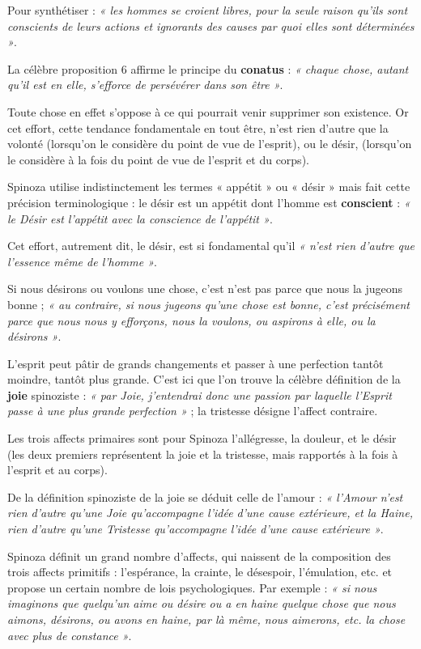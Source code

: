 Pour synthétiser : {\it « les hommes se croient libres, pour la seule raison qu’ils
sont conscients de leurs actions et ignorants des causes par quoi elles sont
déterminées »}.

\vspace{0.5cm}
La célèbre proposition 6 affirme le principe du {\bf conatus} : {\it « chaque chose, autant
qu’il est en elle, s’efforce de persévérer dans son être »}.

Toute chose en effet s’oppose à ce qui pourrait venir supprimer son existence.
Or cet effort, cette tendance fondamentale en tout être, n’est rien d’autre que
la volonté (lorsqu’on le considère du point de vue de l’esprit), ou le désir,
(lorsqu’on le considère à la fois du point de vue de l’esprit et du corps).

\vspace{0.5cm}
Spinoza utilise indistinctement les termes « appétit » ou « désir » mais fait
cette précision terminologique : le désir est un appétit dont l’homme est
{\bf conscient} : {\it « le Désir est l’appétit avec la conscience de l’appétit »}.

Cet effort, autrement dit, le désir, est si fondamental qu’il {\it « n’est rien
d’autre que l’essence même de l’homme »}.

Si nous désirons ou voulons une chose, c’est n’est pas parce que nous la
jugeons bonne ; {\it « au contraire, si nous jugeons qu’une chose est bonne, c’est
précisément parce que nous nous y efforçons, nous la voulons, ou aspirons à
elle, ou la désirons »}.

\vspace{0.5cm}
L’esprit peut pâtir de grands changements et passer à une perfection tantôt
moindre, tantôt plus grande. C’est ici que l’on trouve la célèbre définition
de la {\bf joie} spinoziste : {\it « par Joie, j’entendrai donc une passion par laquelle
l’Esprit passe à une plus grande perfection »} ; la tristesse désigne l’affect
contraire.

Les trois affects primaires sont pour Spinoza l’allégresse, la douleur, et le
désir (les deux premiers représentent la joie et la tristesse, mais rapportés
à la fois à l’esprit et au corps).

De la définition spinoziste de la joie se déduit celle de l’amour : {\it « l’Amour
n’est rien d’autre qu’une Joie qu’accompagne l’idée d’une cause extérieure, et
la Haine, rien d’autre qu’une Tristesse qu’accompagne l’idée d’une cause
extérieure »}.

\vspace{0.5cm}
Spinoza définit un grand nombre d’affects, qui naissent de la composition des
trois affects primitifs : l’espérance, la crainte, le désespoir, l’émulation,
etc. et propose un certain nombre de lois psychologiques. Par exemple : {\it « si
nous imaginons que quelqu’un aime ou désire ou a en haine quelque chose que
nous aimons, désirons, ou avons en haine, par là même, nous aimerons, etc.
la chose avec plus de constance »}.


